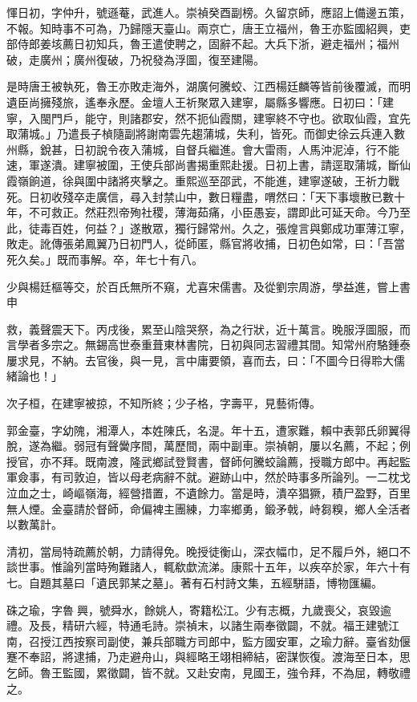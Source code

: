 \begin{pinyinscope}
惲日初，字仲升，號遜菴，武進人。崇禎癸酉副榜。久留京師，應詔上備邊五策，不報。知時事不可為，乃歸隱天臺山。兩京亡，唐王立福州，魯王亦監國紹興，吏部侍郎姜垓薦日初知兵，魯王遣使聘之，固辭不起。大兵下浙，避走福州；福州破，走廣州；廣州復破，乃祝發為浮圖，復至建陽。

是時唐王被執死，魯王亦敗走海外，湖廣何騰蛟、江西楊廷麟等皆前後覆滅，而明遺臣尚擁殘旅，遙奉永歷。金壇人王祈聚眾入建寧，屬縣多響應。日初曰：「建寧，入閩門戶，能守，則諸郡安，然不扼仙霞關，建寧終不守也。欲取仙霞，宜先取蒲城。」乃遣長子楨隨副將謝南雲先趨蒲城，失利，皆死。而御史徐云兵連入數州縣，銳甚，日初說令夜入蒲城，自督兵繼進。會大雷雨，人馬沖泥淖，行不能速，軍遂潰。建寧被圍，王使兵部尚書揭重熙赴援。日初上書，請逕取蒲城，斷仙霞嶺餉道，徐與圍中諸將夾擊之。重熙巡至邵武，不能進，建寧遂破，王祈力戰死。日初收殘卒走廣信，尋入封禁山中，數日糧盡，喟然曰：「天下事壞散已數十年，不可救正。然莊烈帝殉社稷，薄海茹痛，小臣愚妄，謂即此可延天命。今乃至此，徒毒百姓，何益？」遂散眾，獨行歸常州。久之，張煌言與鄭成功軍薄江寧，敗走。訛傳張弟鳳翼乃日初門人，從師匿，縣官將收捕，日初色如常，曰：「吾當死久矣。」既而事解。卒，年七十有八。

少與楊廷樞等交，於百氏無所不窺，尤喜宋儒書。及從劉宗周游，學益進，嘗上書申

救，義聲震天下。丙戌後，累至山陰哭祭，為之行狀，近十萬言。晚服浮圖服，而言學者多宗之。無錫高世泰重葺東林書院，日初與同志習禮其間。知常州府駱鍾泰屢求見，不納。去官後，與一見，言中庸要領，喜而去，曰：「不圖今日得聆大儒緒論也！」

次子桓，在建寧被掠，不知所終；少子格，字壽平，見藝術傳。

郭金臺，字幼隗，湘潭人，本姓陳氏，名湜。年十五，遭家難，賴中表郭氏卵翼得脫，遂為繼。弱冠有聲黌序間，萬歷間，兩中副車。崇禎朝，屢以名薦，不起；例授官，亦不拜。既南渡，隆武鄉試登賢書，督師何騰蛟論薦，授職方郎中。再起監軍僉事，有司敦迫，皆以母老病辭不就。避跡山中，然於時事多所論列。一二枕戈泣血之士，崎嶇嶺海，經營措置，不遺餘力。當是時，潰卒猖獗，積尸盈野，百里無人煙。金臺請於督師，命偏裨主團練，力率鄉勇，鍛矛戟，峙芻糗，鄉人全活者以數萬計。

清初，當局特疏薦於朝，力請得免。晚授徒衡山，深衣幅巾，足不履戶外，絕口不談世事。惟論列當時殉難諸人，輒欷歔流涕。康熙十五年，以疾卒於家，年六十有七。自題其墓曰「遺民郭某之墓」。著有石村詩文集，五經駢語，博物匯編。

硃之瑜，字魯興，號舜水，餘姚人，寄籍松江。少有志概，九歲喪父，哀毀逾禮。及長，精研六經，特通毛詩。崇禎末，以諸生兩奉徵闢，不就。福王建號江南，召授江西按察司副使，兼兵部職方司郎中，監方國安軍，之瑜力辭。臺省劾偃蹇不奉詔，將逮捕，乃走避舟山，與經略王翊相締結，密謀恢復。渡海至日本，思乞師。魯王監國，累徵闢，皆不就。又赴安南，見國王，強令拜，不為屈，轉敬禮之。


\end{pinyinscope}
